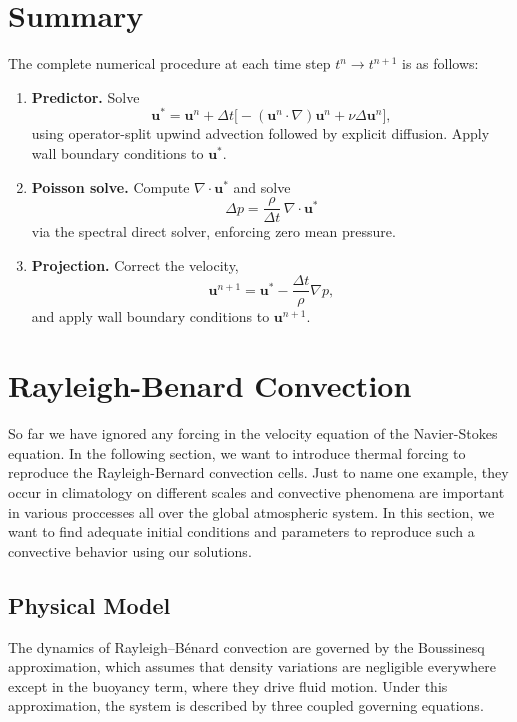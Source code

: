 \section{Summary}
The complete numerical procedure at each time step $t^n \to t^{n+1}$
is as follows:
\begin{enumerate}
    \item \textbf{Predictor.} Solve
          \begin{equation*}
              \mathbf{u}^* = \mathbf{u}^n + \Delta t\bigl[
              -(\mathbf{u}^n\cdot\nabla)\mathbf{u}^n
              + \nu\Delta\mathbf{u}^n\bigr],
          \end{equation*}
          using operator-split upwind advection followed by explicit
          diffusion. Apply wall boundary conditions to $\mathbf{u}^*$.
    \item \textbf{Poisson solve.} Compute
          $\nabla\cdot\mathbf{u}^*$ and solve
          \begin{equation*}
              \Delta p = \frac{\rho}{\Delta t}\,\nabla\cdot\mathbf{u}^*
          \end{equation*}
          via the spectral direct solver, enforcing zero mean pressure.
    \item \textbf{Projection.} Correct the velocity,
          \begin{equation*}
              \mathbf{u}^{n+1} = \mathbf{u}^*
              - \frac{\Delta t}{\rho}\nabla p,
          \end{equation*}
          and apply wall boundary conditions to $\mathbf{u}^{n+1}$.
\end{enumerate}




\section{Rayleigh-Benard Convection}
So far we have ignored any forcing in the velocity equation of the Navier-Stokes equation. In the following section, we want to introduce thermal forcing to reproduce the Rayleigh-Bernard
convection cells. Just to name one example, they occur in climatology on different scales and
convective phenomena are important in various proccesses all over the global atmospheric system. In this section, we want to find adequate initial conditions and parameters to reproduce such a convective behavior using our solutions.

\subsection{Physical Model}
The dynamics of Rayleigh--Bénard convection are governed by the Boussinesq approximation, which assumes that density variations are negligible everywhere except in the buoyancy term, where they drive fluid motion. Under this approximation, the system is described by three coupled governing equations. 

